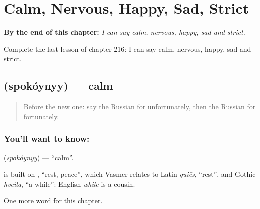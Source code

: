 
\chapter{Calm, Nervous, Happy, Sad, Strict}
\label{ch:ru-calm-nervous-happy-sad-strict}

\begin{chapteropening}
\textbf{By the end of this chapter:} \emph{I can say calm, nervous, happy, sad and strict.}

Complete the last lesson of chapter 216: I can say calm, nervous, happy, sad and strict.
\end{chapteropening}

\section[\texorpdfstring{\ru{спокойный} (spokóynyy)}{спокойный (spokóynyy)}]{ (spokóynyy) — calm}

\label{lesson:RU-C216-spokoynyy}



\begin{quote}
Before the new one: say the Russian for unfortunately, then the Russian for fortunately.
\end{quote}

\subsection*{You'll want to know: }
\textbf{} (\emph{spokóynyy}) — \textquotedblleft{}calm\textquotedblright{}.

\begin{cousinweb}
\textbf{} is built on \emph{}, \textquotedblleft{}rest, peace\textquotedblright{}, which Vasmer relates to Latin \emph{quiēs}, \textquotedblleft{}rest\textquotedblright{}, and Gothic \emph{hveila}, \textquotedblleft{}a while\textquotedblright{}: English \emph{while} is a cousin.
\end{cousinweb}

\begin{grammarlens}[title={What you've built}]
One more word for this chapter.
\end{grammarlens}


